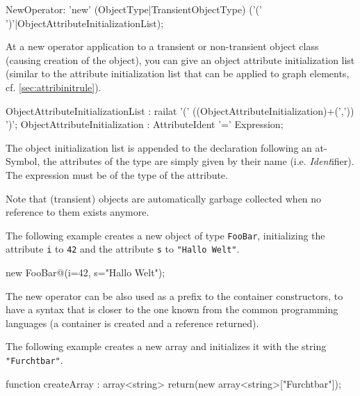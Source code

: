 \begin{rail}
  NewOperator: 'new' (ObjectType|TransientObjectType) ('(' ')'|ObjectAttributeInitializationList);
\end{rail}


At a new operator application to a transient or non-transient object class (causing creation of the object), you can give an object attribute initialization list (similar to the attribute initialization list that can be applied to graph elements, cf. \ref{sec:attribinitrule}).

\begin{rail}
ObjectAttributeInitializationList : railat '(' ((ObjectAttributeInitialization)+(',')) ')';
ObjectAttributeInitialization : AttributeIdent '=' Expression;
\end{rail}

The object initialization list is appended to the declaration following an at-Symbol, the attributes of the type are simply given by their name (i.e. \emph{Ident}ifier).
The expression must be of the type of the attribute.  

Note that (transient) objects are automatically garbage collected when no reference to them exists anymore.

\begin{example}
The following example creates a new object of type \texttt{FooBar}, initializing the attribute \texttt{i} to \texttt{42} and the attribute \texttt{s} to \texttt{"Hallo Welt"}.
\begin{grgen}
new FooBar@(i=42, s="Hallo Welt");
\end{grgen}
\end{example}

The new operator can be also used as a prefix to the container constructors, to have a syntax that is closer to the one known from the common programming languages (a container is created and a reference returned).

\begin{example}
The following example creates a new array and initializes it with the string \texttt{"Furchtbar"}.
\begin{grgen}
function createArray : array<string>
{
  return(new array<string>["Furchtbar"]);
}
\end{grgen}
\end{example}

